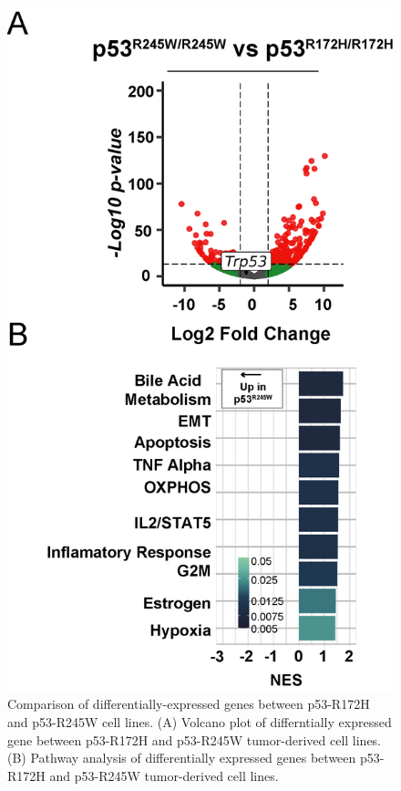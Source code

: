 \begin{figure}
\hypertarget{fig:3.12}{%
\centering
\includegraphics[width=1\textwidth,height=\textheight]{images/p5310.png}
\caption{Comparison of differentially-expressed genes between p53-R172H and p53-R245W cell lines. (A) Volcano plot of differntially expressed gene between p53-R172H and p53-R245W tumor-derived cell lines. (B) Pathway analysis of differentially expressed genes between p53-R172H and p53-R245W tumor-derived cell lines.}\label{fig:3.12}
}
\end{figure}

